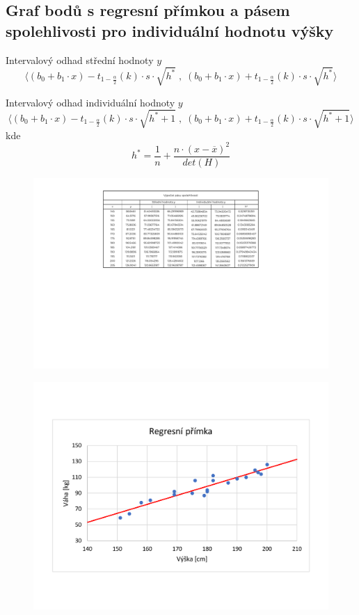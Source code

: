 \subsection{Graf bodů s regresní přímkou a pásem spolehlivosti pro individuální hodnotu výšky}

\begin{compactitem}
    \item Intervalový odhad střední hodnoty $y$
    $${\displaystyle \Big\langle (b_0 + b_1 \cdot x) - t_{1 - \frac{\alpha}{2}}(k) \cdot s \cdot \sqrt{h^*} \;,\; (b_0 + b_1 \cdot x) + t_{1 - \frac{\alpha}{2}}(k) \cdot s \cdot \sqrt{h^*} \Big\rangle}$$

    \item Intervalový odhad individuální hodnoty $y$
    $${\displaystyle \Big\langle (b_0 + b_1 \cdot x) - t_{1 - \frac{\alpha}{2}}(k) \cdot s \cdot \sqrt{h^* + 1} \;,\; (b_0 + b_1 \cdot x) + t_{1 - \frac{\alpha}{2}}(k) \cdot s \cdot \sqrt{h^* + 1} \Big\rangle}$$
    kde
    $${\displaystyle h^* = \frac{1}{n} + \frac{n \cdot (x - \overline{x})^2}{det(H)}}$$
\end{compactitem}

\begin{figure}[H]
    \centering
    \includegraphics[width=1\linewidth]{2-c-1-crop.pdf}
\end{figure}
\bigskip

\begin{figure}[H]
    \centering
    \includegraphics[width=.9\linewidth]{2-c-2-crop.pdf}
\end{figure}
\bigskip

